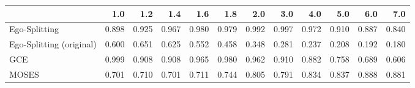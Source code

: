 \begin{tabular}{lrrrrrrrrrrr}
\toprule
{} &   1.0 &   1.2 &   1.4 &   1.6 &   1.8 &   2.0 &   3.0 &   4.0 &   5.0 &   6.0 &   7.0 \\
\midrule
Ego-Splitting            & 0.898 & 0.925 & 0.967 & 0.980 & 0.979 & 0.992 & 0.997 & 0.972 & 0.910 & 0.887 & 0.840 \\
Ego-Splitting (original) & 0.600 & 0.651 & 0.625 & 0.552 & 0.458 & 0.348 & 0.281 & 0.237 & 0.208 & 0.192 & 0.180 \\
GCE                      & 0.999 & 0.908 & 0.908 & 0.965 & 0.980 & 0.962 & 0.910 & 0.882 & 0.758 & 0.689 & 0.606 \\
MOSES                    & 0.701 & 0.710 & 0.701 & 0.711 & 0.744 & 0.805 & 0.791 & 0.834 & 0.837 & 0.888 & 0.881 \\
\bottomrule
\end{tabular}
